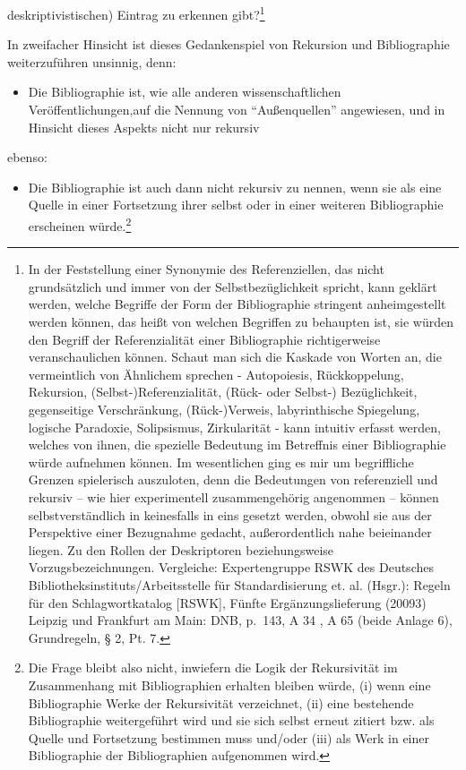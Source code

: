 \documentclass[a4paper,
fontsize=11pt,
oneside,
numbers=noperiodatend,
parskip=half-,
bibliography=totoc,
final
]{scrartcl}
\providecommand{\tightlist}{%
  \setlength{\itemsep}{0pt}\setlength{\parskip}{0pt}}
\begin{document}
deskriptivistischen) Eintrag zu erkennen gibt?\footnote{In der
  Feststellung einer Synonymie des Referenziellen, das nicht
  grundsätzlich und immer von der Selbstbezüglichkeit spricht, kann
  geklärt werden, welche Begriffe der Form der Bibliographie stringent
  anheimgestellt werden können, das heißt von welchen Begriffen zu
  behaupten ist, sie würden den Begriff der Referenzialität einer
  Bibliographie richtigerweise veranschaulichen können. Schaut man sich
  die Kaskade von Worten an, die vermeintlich von Ähnlichem sprechen -
  Autopoiesis, Rückkoppelung, Rekursion, (Selbst-)Referenzialität,
  (Rück- oder Selbst-) Bezüglichkeit, gegenseitige Verschränkung,
  (Rück-)Verweis, labyrinthische Spiegelung, logische Paradoxie,
  Solipsismus, Zirkularität - kann intuitiv erfasst werden, welches von
  ihnen, die spezielle Bedeutung im Betreffnis einer Bibliographie würde
  aufnehmen können. Im wesentlichen ging es mir um begriffliche Grenzen
  spielerisch auszuloten, denn die Bedeutungen von referenziell und
  rekursiv -- wie hier experimentell zusammengehörig angenommen --
  können selbstverständlich in keinesfalls in eins gesetzt werden,
  obwohl sie aus der Perspektive einer Bezugnahme gedacht,
  außerordentlich nahe beieinander liegen. Zu den Rollen der
  Deskriptoren beziehungsweise Vorzugsbezeichnungen. Vergleiche:
  Expertengruppe RSWK des Deutsches Bibliotheksinstituts/Arbeitsstelle
  für Standardisierung et. al. (Hsgr.): Regeln für den Schlagwortkatalog
  {[}RSWK{]}, Fünfte Ergänzungslieferung (20093) Leipzig und Frankfurt
  am Main: DNB, p.~143, A 34 , A 65 (beide Anlage 6), Grundregeln, § 2,
  Pt. 7.}

In zweifacher Hinsicht ist dieses Gedankenspiel von Rekursion und
Bibliographie weiterzuführen unsinnig, denn:

\begin{itemize}
\tightlist
\item
  Die Bibliographie ist, wie alle anderen wissenschaftlichen
  Veröffentlichungen,auf die Nennung von \enquote{Außenquellen}
  angewiesen, und in Hinsicht dieses Aspekts nicht nur rekursiv
\end{itemize}

ebenso:

\begin{itemize}
\tightlist
\item
  Die Bibliographie ist auch dann nicht rekursiv zu nennen, wenn sie als
  eine Quelle in einer Fortsetzung ihrer selbst oder in einer weiteren
  Bibliographie erscheinen würde.\footnote{Die Frage bleibt also nicht,
    inwiefern die Logik der Rekursivität im Zusammenhang mit
    Bibliographien erhalten bleiben würde, (i) wenn eine Bibliographie
    Werke der Rekursivität verzeichnet, (ii) eine bestehende
    Bibliographie weitergeführt wird und sie sich selbst erneut zitiert
    bzw. als Quelle und Fortsetzung bestimmen muss und/oder (iii) als
    Werk in einer Bibliographie der Bibliographien aufgenommen wird.}
\end{itemize}
\end{document}
